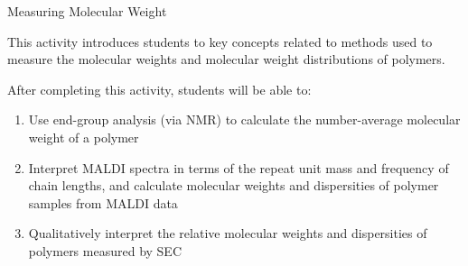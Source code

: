 %
%
%
%

\renewcommand{\figpath}{content/intro/measuring-MW/figs}
\renewcommand{\labelbase}{measuring-MW}

\begin{activity}{Measuring Molecular Weight}
\label{\labelbase}

\begin{instructornotes}

	This activity introduces students to key concepts related to methods used to measure the molecular weights and molecular weight distributions of polymers.
	
	After completing this activity, students will be able to:
			\begin{enumerate}
				\item Use end-group analysis (via NMR) to calculate the number-average molecular weight of a polymer
				\item Interpret MALDI spectra in terms of the repeat unit mass and frequency of chain lengths, and calculate molecular weights and dispersities of polymer samples from MALDI data
				\item Qualitatively interpret the relative molecular weights and dispersities of polymers measured by SEC
			\end{enumerate}
			

\end{instructornotes}
\end{activity}
